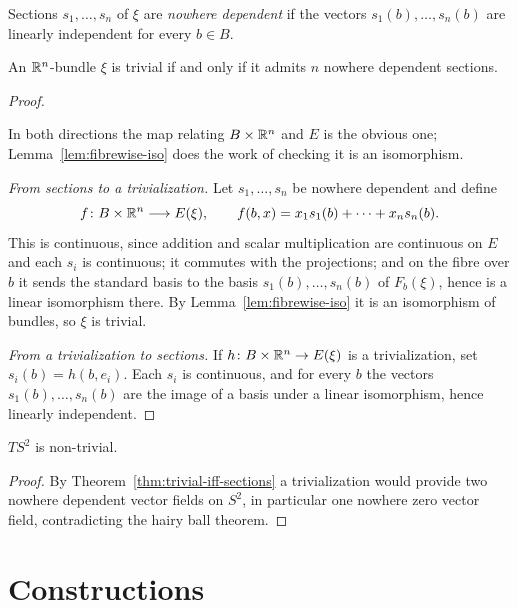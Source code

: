 \begin{definition}
Sections $s_1,\dots,s_n$ of $\xi$ are \emph{nowhere dependent} if the vectors
$s_1(b),\dots,s_n(b)$ are linearly independent for every $b\in B$.
\end{definition}

\begin{theorem}\label{thm:trivial-iff-sections}
An $\mathbb{R}^n$-bundle $\xi$ is trivial if and only if it admits $n$ nowhere dependent
sections.
\end{theorem}

\begin{proof}
\begin{strategy}
In both directions the map relating $B\times\mathbb{R}^n$ and $E$ is the obvious one;
Lemma~\ref{lem:fibrewise-iso} does the work of checking it is an isomorphism.
\end{strategy}

 \emph{From sections to a trivialization.} Let $s_1,\dots,s_n$ be
nowhere dependent and define
\[
f\colon B\times\mathbb{R}^n\longrightarrow E(\xi),
\qquad
f(b,x)=x_1s_1(b)+\dots+x_ns_n(b).
\]
This is continuous, since addition and scalar multiplication are continuous on
$E$ and each $s_i$ is continuous; it commutes with the projections; and on the
fibre over $b$ it sends the standard basis to the basis $s_1(b),\dots,s_n(b)$ of
$F_b(\xi)$, hence is a linear isomorphism there. By
Lemma~\ref{lem:fibrewise-iso} it is an isomorphism of bundles, so $\xi$ is
trivial.

 \emph{From a trivialization to sections.} If
$h\colon B\times\mathbb{R}^n\to E(\xi)$ is a trivialization, set $s_i(b)=h(b,e_i)$. Each
$s_i$ is continuous, and for every $b$ the vectors $s_1(b),\dots,s_n(b)$ are the
image of a basis under a linear isomorphism, hence linearly independent.
\end{proof}

\begin{corollary}
$TS^2$ is non-trivial.
\end{corollary}

\begin{proof}
By Theorem~\ref{thm:trivial-iff-sections} a trivialization would provide two
nowhere dependent vector fields on $S^2$, in particular one nowhere zero vector
field, contradicting the hairy ball theorem.
\end{proof}

\section{Constructions}

